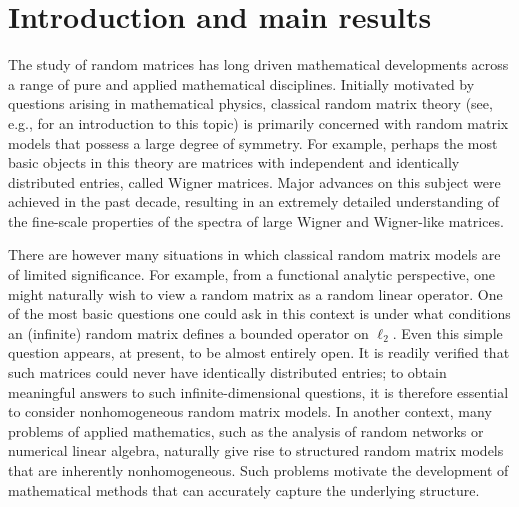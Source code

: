 \documentclass[10pt,reqno]{amsart}
\theoremstyle{definition}
\numberwithin{equation}{section}
\numberwithin{figure}{section}
\numberwithin{table}{section}
\begin{document}
\thispagestyle{empty}

\section{Introduction and main results}

The study of random matrices has long driven mathematical developments 
across a range of pure and applied mathematical disciplines. Initially 
motivated by questions arising in mathematical physics, classical random 
matrix theory (see, e.g., \cite{Tao12} for an introduction to this 
topic) is primarily concerned with random matrix models that possess a 
large degree of symmetry. For example, perhaps the most basic objects in 
this theory are matrices with independent and identically distributed 
entries, called Wigner matrices. Major advances on this subject were 
achieved in the past decade, resulting in an extremely detailed 
understanding of the fine-scale properties of the spectra of large Wigner 
and Wigner-like matrices.

There are however many situations in which classical random matrix models 
are of limited significance. For example, from a functional analytic 
perspective, one might naturally wish to view a random matrix as a random 
linear operator. One of the most basic questions one could ask in this 
context is under what conditions an (infinite) random matrix defines a 
bounded operator on $\ell_2$. Even this simple question appears, at 
present, to be almost entirely open. It is readily verified that such 
matrices could never have identically distributed entries; to obtain 
meaningful answers to such infinite-dimensional questions, it is therefore 
essential to consider nonhomogeneous random matrix models. In another 
context, many problems of applied mathematics, such as the analysis of 
random networks or numerical linear algebra, naturally give rise to 
structured random matrix models that are inherently nonhomogeneous. Such 
problems motivate the development of mathematical methods that can 
accurately capture the underlying structure.
\end{document}
